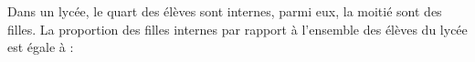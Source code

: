 
Dans un lycée, le quart des élèves sont internes, parmi eux, la moitié sont des filles. La proportion des filles internes par rapport à l'ensemble des élèves du lycée est égale à :

\smallskip

